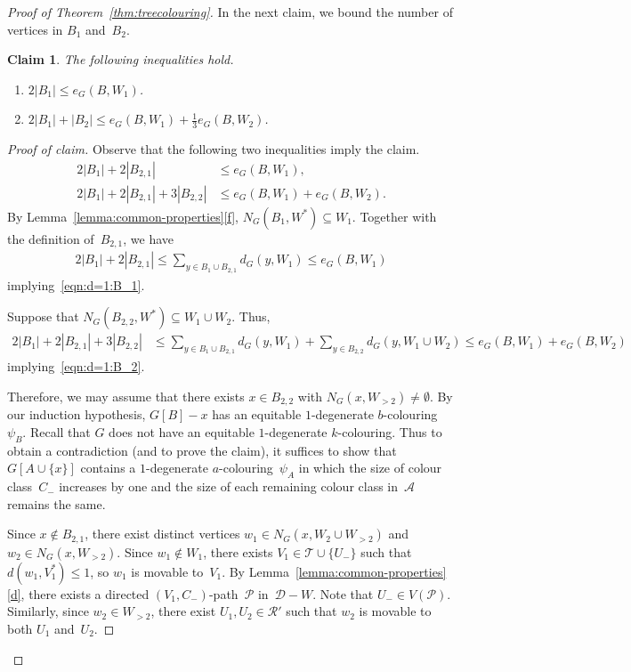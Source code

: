 \documentclass[11pt]{article}
\newenvironment{proofclaim}[1][Proof of claim]{\begin{proof}[#1]\renewcommand*{\qedsymbol}{\(\blacksquare\)}}{\end{proof}}
\theoremstyle{plain}
\newtheorem{claim}[thm]{Claim}
\numberwithin{equation}{section}
\begin{document}
\begin{proof}[Proof of Theorem~\ref{thm:treecolouring}]
In the next claim, we bound the number of vertices in $B_1$ and~$B_2$.
\begin{claim} \label{clm:d=1:B}
The following inequalities hold.
\begin{enumerate}[label={\rm(\alph*)},start=1]
	\item $2|B_1| \le e_G(B,W_1)$. \label{itm:d=1:B1}
	\item $2|B_1| + |B_2| \le e_G(B,W_1) +\frac13 e_G(B, W_2)$.\label{itm:d=1:B2}
\end{enumerate}
\end{claim}

\begin{proofclaim}
Observe that the following two inequalities imply the claim.
\begin{align}
		2|B_1| + 2 |B_{2,1}| &\le e_G(B,W_1), \label{eqn:d=1:B_1}\\
	2|B_1| + 2 |B_{2,1}| + 3|B_{2,2}| & \le e_G(B,W_1)+e_G(B,W_2). \label{eqn:d=1:B_2}
\end{align}
By Lemma~\ref{lemma:common-properties}\ref{f},  $N_G(B_1, W^*) \subseteq W_1$.
Together with the definition of~$B_{2,1}$, we have
\begin{align*}
	2|B_1| + 2 |B_{2,1}| \le \sum_{y \in B_1 \cup B_{2,1} } d_{G}(y,W_1) \le e_G(B,W_1)
\end{align*}
implying~\eqref{eqn:d=1:B_1}.

Suppose that $N_G(B_{2,2}, W^*) \subseteq W_1 \cup W_2$.
Thus,
\begin{align*}
	2|B_1| + 2 |B_{2,1}| + 3|B_{2,2}| & \le \sum_{y \in B_1 \cup B_{2,1} } d_{G}(y,W_1) +  \sum_{y \in B_{2,2} } d_{G}(y,W_1 \cup W_2)
	 \le e_G(B,W_1)+e_G(B,W_2)
\end{align*}
implying~\eqref{eqn:d=1:B_2}.

Therefore, we may assume that there exists $x \in B_{2,2}$ with $N_G(x,W_{>2}) \ne \emptyset$.
By our induction hypothesis, $G[B]-x$ has an equitable $1$-degenerate $b$-colouring~$\psi_B$.
Recall that $G$ does not have an equitable $1$-degenerate $k$-colouring.
Thus to obtain a contradiction (and to prove the claim), it suffices to show that $G[A \cup \{x\}]$ contains a $1$-degenerate $a$-colouring~$\psi_A$ in which the size of colour class~$C_-$ increases by one and the size of each remaining colour class in~$\mathcal{A}$ remains the same.


Since $x \notin B_{2,1}$, there exist distinct vertices $w_1 \in N_G(x,W_2 \cup W_{>2})$ and $w_2 \in N_G(x, W_{>2})$.
Since $w_1 \notin W_1$, there exists $V_1 \in \mathcal{T} \cup \{U_-\}$ such that $d(w_1, V^*_1) \le 1$, so $w_1$ is movable to~$V_1$.
By Lemma~\ref{lemma:common-properties}\ref{d}, there exists a directed $(V_1, C_-)$-path~$\mathcal{P}$ in~$\mathcal{D}-W$.
Note that $U_- \in V(\mathcal{P})$.
Similarly, since $w_2 \in W_{>2}$, there exist $U_1,U_2 \in \mathcal{R}'$ such that $w_2$ is movable to both $U_1$ and~$U_2$.




\end{proofclaim}
\end{proof}
\end{document}
